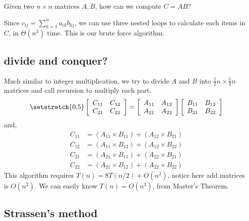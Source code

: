 \documentclass[11pt, a4paper]{COMP3711}
\begin{document}
\begin{spacing}{1.5}
    Given two $n\times n$ matrices $A, B$, how can we compute 
    $C=AB$?
    
    Since $c_{ij}=\sum_{k=1}^{n}a_{ik}b_{kj}$, 
    we can use three nested loops to calculate each items in $C$,
    in $\Theta(n^3)$ time. This is our brute force algorithm.

    \subsection{divide and conquer?}

    Much similar to integer multiplication, we try to divide 
    $A$ and $B$ into $\frac{1}{2}n\times \frac{1}{2}n$ matrices 
    and call recursion to multiply each part.
    \begin{align*}
        \setstretch{0.5}
        \left[ \begin{array}{cc}
            C_{11} & C_{12} \\
            C_{21} & C_{22}
        \end{array} \right]
        =
        \left[ \begin{array}{cc}
            A_{11} & A_{12} \\
            A_{21} & A_{22}
        \end{array} \right]
        \left[ \begin{array}{cc}
            B_{11} & B_{12} \\
            B_{21} & B_{22}
        \end{array} \right]
    \end{align*}
    and,
    \begin{align*}
        C_{11} &= (A_{11}\times B_{11}) + (A_{12}\times B_{21}) \\
        C_{12} &= (A_{11}\times B_{12}) + (A_{12}\times B_{22}) \\
        C_{21} &= (A_{21}\times B_{11}) + (A_{22}\times B_{21}) \\
        C_{22} &= (A_{21}\times B_{12}) + (A_{22}\times B_{22}) 
    \end{align*}
    This algorithm requires $T(n)=8T(n/2)+O(n^2)$, notice 
    here add matrices is $O(n^2)$. We can easily know 
    $T(n)=O(n^3)$, from Master's Theorem.

    \subsection{Strassen's method}


\end{spacing}
\end{document}
